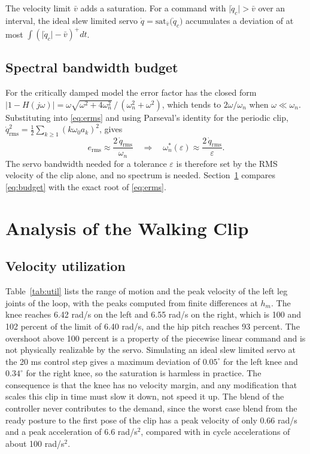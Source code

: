 \documentclass[10pt,journal]{IEEEtran}
\begin{document}
The velocity limit $\bar v$ adds a saturation. For a command with $\lvert\dot q_c\rvert>\bar v$ over an interval, the ideal slew limited servo $\dot q=\mathrm{sat}_{\bar v}\bigl(\dot q_c\bigr)$ accumulates a deviation of at most $\int(\lvert\dot q_c\rvert-\bar v)^+dt$.

\subsection{Spectral bandwidth budget}
For the critically damped model the error factor has the closed form $\lvert1-H(j\omega)\rvert=\omega\sqrt{\omega^2+4\omega_n^2}\,/\,(\omega_n^2+\omega^2)$, which tends to $2\omega/\omega_n$ when $\omega\ll\omega_n$. Substituting into \eqref{eq:erms} and using Parseval's identity for the periodic clip, $\dot q_{\mathrm{rms}}^{2}=\tfrac12\sum_{k\ge1}(k\omega_0a_k)^2$, gives
\begin{equation}
e_{\mathrm{rms}}\approx\frac{2\,\dot q_{\mathrm{rms}}}{\omega_n}
\quad\Longrightarrow\quad
\omega_n^{*}(\varepsilon)\approx\frac{2\,\dot q_{\mathrm{rms}}}{\varepsilon}.
\label{eq:budget}
\end{equation}
The servo bandwidth needed for a tolerance $\varepsilon$ is therefore set by the RMS velocity of the clip alone, and no spectrum is needed. Section~\ref{sec:analysis} compares \eqref{eq:budget} with the exact root of \eqref{eq:erms}.

\section{Analysis of the Walking Clip}
\label{sec:analysis}
\subsection{Velocity utilization}
Table~\ref{tab:util} lists the range of motion and the peak velocity of the left leg joints of the loop, with the peaks computed from finite differences at $h_m$. The knee reaches 6.42 rad/s on the left and 6.55 rad/s on the right, which is 100 and 102 percent of the limit of 6.40 rad/s, and the hip pitch reaches 93 percent. The overshoot above 100 percent is a property of the piecewise linear command and is not physically realizable by the servo. Simulating an ideal slew limited servo at the 20 ms control step gives a maximum deviation of $0.05^\circ$ for the left knee and $0.34^\circ$ for the right knee, so the saturation is harmless in practice. The consequence is that the knee has no velocity margin, and any modification that scales this clip in time must slow it down, not speed it up. The blend of the controller never contributes to the demand, since the worst case blend from the ready posture to the first pose of the clip has a peak velocity of only 0.66 rad/s and a peak acceleration of 6.6 rad/s$^2$, compared with in cycle accelerations of about 100 rad/s$^2$.
\end{document}
